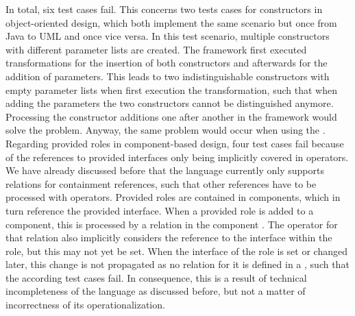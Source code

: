In total, six test cases fail.
This concerns two tests cases for constructors in object-oriented design, which both implement the same scenario but once from Java to \gls{UML} and once vice versa.
In this test scenario, multiple constructors with different parameter lists are created.
The \vitruv framework first executed transformations for the insertion of both constructors and afterwards for the addition of parameters.
This leads to two indistinguishable constructors with empty parameter lists when first execution the transformation, such that when adding the parameters the two constructors cannot be distinguished anymore.
Processing the constructor additions one after another in the framework would solve the problem.
Anyway, the same problem would occur when using the \reactionslanguage.
Regarding provided roles in component-based design, four test cases fail because of the references to provided interfaces only being implicitly covered in operators.
We have already discussed before that the \commonalities language currently only supports relations for containment references, such that other references have to be processed with operators.
Provided roles are contained in components, which in turn reference the provided interface.
When a provided role is added to a component, this is processed by a relation in the component \commonality.
The operator for that relation also implicitly considers the reference to the interface within the role, but this may not yet be set.
When the interface of the role is set or changed later, this change is not propagated as no relation for it is defined in a \commonality, such that the according test cases fail.
In consequence, this is a result of technical incompleteness of the \commonalities language as discussed before, but not a matter of incorrectness of its operationalization.




